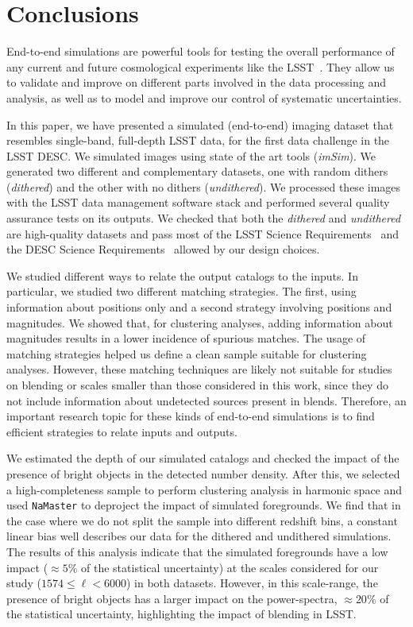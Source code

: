 \documentclass[twocolumn]{aastex62}
\begin{document}
\section{Conclusions}
\label{sec:conclusions}

End-to-end simulations are powerful tools for testing the overall performance of any current and future cosmological experiments like the LSST~\citep{Overview}. They allow us to validate and improve on different parts involved in the data processing and analysis, as well as to model and improve our control of systematic uncertainties.

In this paper, we have presented a simulated (end-to-end) imaging dataset that resembles single-band, full-depth LSST data, for the first data challenge in the LSST DESC. We simulated images using state of the art tools (\textit{imSim}). We generated two different and complementary datasets, one with random dithers (\textit{dithered}) and the other with no dithers (\textit{undithered}). We processed these images with the LSST data management software stack and performed several quality assurance tests on its outputs. We checked that both the \textit{dithered} and \textit{undithered} are high-quality datasets and pass most of the LSST Science Requirements~\citep{LPM-17} and the DESC Science Requirements~\citep{2018arXiv180901669T} allowed by our design choices.

We studied different ways to relate the output catalogs to the inputs. In particular, we studied two different matching strategies. The first, using information about positions only and a second strategy involving positions and magnitudes. We showed that, for clustering analyses, adding information about magnitudes results in a lower incidence of spurious matches. The usage of matching strategies helped us define a clean sample suitable for clustering analyses. However, these matching techniques are likely not suitable for studies on blending or scales smaller than those considered in this work, since they do not include information about undetected sources present in blends. Therefore, an important research topic for these kinds of end-to-end simulations is to find efficient strategies to relate inputs and outputs.

We estimated the depth of our simulated catalogs and checked the impact of the presence of bright objects in the detected number density. After this, we selected a high-completeness sample to perform clustering analysis in harmonic space and used \texttt{NaMaster} to deproject the impact of simulated foregrounds. We find that in the case where we do not split the sample into different redshift bins, a constant linear bias well describes our data for the dithered and undithered simulations. The results of this analysis indicate that the simulated foregrounds have a low impact ($\approx 5\%$ of the statistical uncertainty) at the scales considered for our study ($1574 \leq \ell < 6000$) in both datasets. However, in this scale-range, the presence of bright objects has a larger impact on the power-spectra, $\approx 20\%$ of the statistical uncertainty, highlighting the impact of blending in LSST. 
\end{document}

